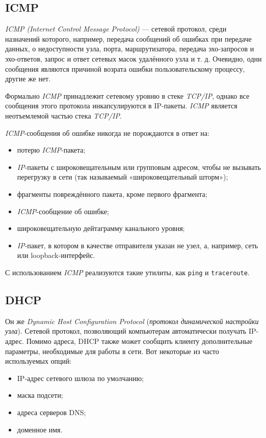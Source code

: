 \subsection{ICMP}
\emph{ICMP (Internet Control Message Protocol)} — сетевой протокол, среди назначений которого, например, передача сообщений об ошибках при передаче данных, о недоступности узла, порта, маршрутизатора, передача эхо-запросов и эхо-ответов, запрос и ответ сетевых масок удалённого узла и т. д. Очевидно, одни сообщения являются причиной возрата ошибки пользовательскому процессу, другие же нет.

Формально \emph{ICMP} принадлежит сетевому уровню в стеке \emph{TCP/IP}, однако все сообщения этого протокола инкапсулируются в IP-пакеты. \emph{ICMP} является неотъемлемой частью стека \emph{TCP/IP}.

\emph{ICMP}-сообщения об ошибке никогда не порождаются в ответ на:
\begin{itemize}
  \item потерю \emph{ICMP}-пакета;
  \item \emph{IP}-пакеты с широковещательным или групповым адресом, чтобы не вызывать перегрузку в сети (так называемый «широковещательный шторм»);
  \item фрагменты повреждённого пакета, кроме первого фрагмента;
  \item \emph{ICMP}-сообщение об ошибке;
  \item широковещательную дейтаграмму канального уровня;
  \item \emph{IP}-пакет, в котором в качестве отправителя указан не узел, а, например, сеть или loopback-интерфейс.
\end{itemize}

С использованием \emph{ICMP} реализуются такие утилиты, как \lstinline{ping} и \lstinline{traceroute}.

\subsection{DHCP}
Он же \emph{Dynamic Host Configuration Protocol} (\emph{протокол динамической настройки узла}). Сетевой протокол, позволяющий компьютерам автоматически получать IP-адрес. Помимо адреса, DHCP также может сообщить клиенту дополнительные параметры, необходимые для работы в сети. Вот некоторые из часто используемых опций:
\begin{itemize}
  \item IP-адрес сетевого шлюза по умолчанию;
  \item маска подсети;
  \item адреса серверов DNS;
  \item доменное имя.
\end{itemize}

